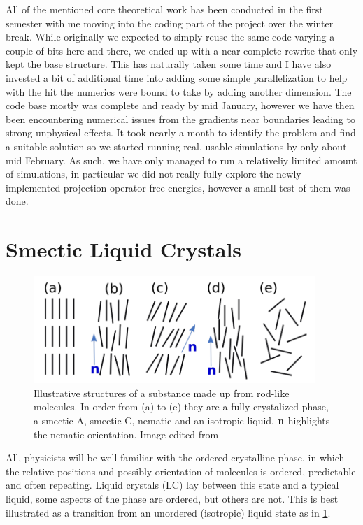 \documentclass[12pt]{article}
\begin{document}
    All of the mentioned core theoretical work has been conducted in the first semester with me moving into the coding part of the project over the winter break.
    While originally we expected to simply reuse the same code varying a couple of bits here and there, we ended up with a near complete rewrite that only kept the base structure.
    This has naturally taken some time and I have also invested a bit of additional time into adding some simple parallelization to help with the hit the numerics were bound to take by adding another dimension.
    The code base mostly was complete and ready by mid January, however we have then been encountering numerical issues from the gradients near boundaries leading to strong unphysical effects.
    It took nearly a month to identify the problem and find a suitable solution so we started running real, usable simulations by only about mid February.
    As such, we have only managed to run a relativeliy limited amount of simulations, in particular we did not really fully explore the newly implemented projection operator free energies, however a small test of them was done.

\maintext

\section{Smectic Liquid Crystals}\label{sec:intro}
    \begin{figure}[t]
        \begin{center}
            \includegraphics[width=0.95\textwidth]{figures/phases.pdf}
        \end{center}
        \caption{
            Illustrative structures of a substance made up from rod-like molecules.
            In order from (a) to (e) they are a fully crystalized phase, a smectic A, smectic C, nematic and an isotropic liquid.
            $\vb{n}$ highlights the nematic orientation.
            Image edited from\cite{pagetComplexTensorsSimple2023}
        }\label{fig:phases}
    \end{figure}
    All, physicists will be well familiar with the ordered crystalline phase, in which the relative positions and possibly orientation of molecules is ordered, predictable and often repeating.
    Liquid crystals (LC) lay between this state and a typical liquid, some aspects of the phase are ordered, but others are not.
    This is best illustrated as a transition from an unordered (isotropic) liquid state as in \cref{fig:phases}.
\end{document}
